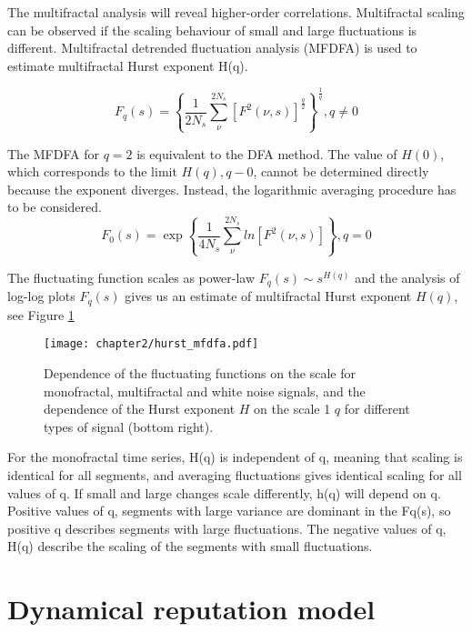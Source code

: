 The multifractal analysis will reveal higher-order correlations. Multifractal scaling can be observed if the scaling behaviour of small and large fluctuations is different. Multifractal detrended fluctuation analysis (MFDFA) is used \cite{kantelhardt2002, ihlen2012} to estimate multifractal Hurst exponent H(q). 

\begin{equation}
F_q(s) = \left\{\frac{1}{2N_s}\sum_{\nu}^{2N_s}\left[F^2(\nu, s)\right]^{\frac{q}{2}}\right\}^{\frac{1}{q}},  q \neq 0 \nonumber
\end{equation}

The MFDFA for $q=2$ is equivalent to the DFA method. The value of $H(0)$, which corresponds to the limit $H(q), q-0$, cannot be determined directly because the exponent diverges. Instead, the logarithmic averaging procedure has to be considered. 
\begin{equation}
F_0(s) = \exp \left\{\frac{1}{4N_s}\sum_{\nu}^{2N_s}ln \left[F^2(\nu, s)\right]\right\}, q=0
\end{equation}

The fluctuating function scales as power-law $F_q(s) \sim s^{H(q)}$ and the analysis of log-log plots $F_q(s)$ gives us an estimate of multifractal Hurst exponent $H(q)$, see Figure \ref{fig:hurst_mfdfa}

\begin{figure}[h]
	\centering
	\texttt{[image: chapter2/hurst\_mfdfa.pdf]}
	\caption[Fluctuating function and Hurst exponent.]{Dependence of the fluctuating functions on the scale for monofractal, multifractal and white noise signals, and the dependence of the Hurst exponent $H$ on the scale 1 $q$ for different types of signal (bottom right).}
	\label{fig:hurst_mfdfa}
\end{figure}

For the monofractal time series, H(q) is independent of q, meaning that scaling is identical for all segments, and averaging fluctuations gives identical scaling for all values of q. If small and large changes scale differently, h(q) will depend on q. Positive values of q, segments with large variance are dominant in the Fq(s), so positive q describes segments with large fluctuations. The negative values of q, H(q) describe the scaling of the segments with small fluctuations. 

\section{Dynamical reputation model} \label{sec:met_dibrm}


